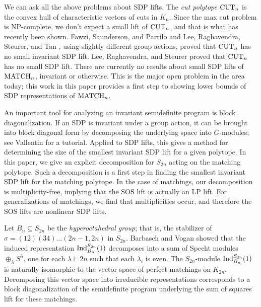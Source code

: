\documentclass[12pt]{amsart}
\numberwithin{theorem}{section}
\newcommand{\Ind}{\textup{Ind}}
\newcommand{\MATCH}{\textup{MATCH}}
\newcommand{\CUT}{\textup{CUT}}
\begin{document}
We can ask all the above problems about SDP lifts.
The {\em cut polytope} $\CUT_n$ is the convex hull of characteristic vectors of cuts in $K_{n}$.
Since the max cut problem is NP-complete, we don't expect a small lift of $\CUT_n$, and that is what has recently been shown.
Fawzi, Saunderson, and Parrilo \cite{fawzi2014equivariant} and Lee, Raghavendra, Steurer, and Tan \cite{lee2014power}, using slightly different group actions, proved that $\CUT_n$ has no small invariant SDP lift.
Lee, Raghavendra, and Steurer \cite{lee2014lower} proved that $\CUT_n$ has no small SDP lift.
There are currently no results about small SDP lifts of $\MATCH_n$, invariant or otherwise.
This is the major open problem in the area today; this work in this paper provides a first step to showing lower bounds of SDP representations of $\MATCH_n$.

An important tool for analyzing an invariant semidefinite program is block diagonalization.
If an SDP is invariant under a group action, it can be brought into block diagonal form by decomposing the underlying space into $G$-modules; see Vallentin \cite{vallentin2009symmetry} for a tutorial.
Applied to SDP lifts, this gives a method for determining the size of the smallest invariant SDP lift for a given polytope.
In this paper, we give an explicit decomposition for $S_{2n}$ acting on the matching polytope.
Such a decomposition is a first step in finding the smallest invariant SDP lift for the matching polytope.
In the case of matchings, our decomposition is multiplicity-free, implying that the SOS lift is actually an LP lift.
For generalizations of matchings, we find that multiplicities occur, and therefore the SOS lifts are nonlinear SDP lifts.


Let $B_n \subseteq S_{2n}$ be the {\em hyperoctahedral group}; that is, the stabilizer of $\sigma = (12)(34)\ldots (2n-1,2n)$ in $S_{2n}$.
Barbasch and Vogan \cite{bv} showed that the induced representation $\Ind_{B_n}^{S_{2n}}(1)$ decomposes into a sum of Specht modules $\oplus_\lambda S^\lambda$, one for each $\lambda \vdash 2n$ such that each $\lambda_i$ is even.
The $S_{2n}$-module $\Ind_{B_n}^{S_{2n}}(1)$ is naturally isomorphic to the vector space of perfect matchings on $K_{2n}$.
Decomposing this vector space into irreducible representations corresponds to a block diagonalization of the semidefinite program underlying the sum of squares lift for these matchings.
\end{document}
